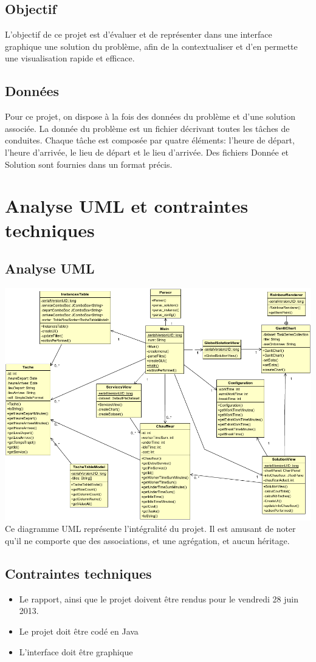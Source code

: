 \documentclass[12pt]{article}
\begin{document}
\subsection{Objectif}
L’objectif de ce projet est d’évaluer et de représenter dans une interface graphique une solution du problème, afin de la contextualiser et d'en permette une visualisation rapide et efficace.
\subsection{Données}
Pour ce projet, on dispose à la fois des données du problème et d’une solution associée. La donnée du problème est un fichier décrivant toutes les tâches de conduites. Chaque tâche est composée par quatre éléments: l’heure de départ, l’heure d’arrivée, le lieu de départ et le lieu d’arrivée.
Des fichiers Donnée et Solution sont fournies dans un format précis.

\newpage
\section{Analyse UML et contraintes techniques}
\subsection{Analyse UML}
\includegraphics[width=1\textwidth]{../UML/global.png}
Ce diagramme UML représente l'intégralité du projet. Il est amusant de noter qu'il ne comporte que des associations, et une agrégation, et aucun héritage. 
\subsection{Contraintes techniques}
\begin{itemize}
    \item Le rapport, ainsi que le projet doivent être rendus pour le vendredi 28 juin 2013.
    \item Le projet doit être codé en Java
    \item L'interface doit être graphique
\end{itemize}
		
\end{document}
